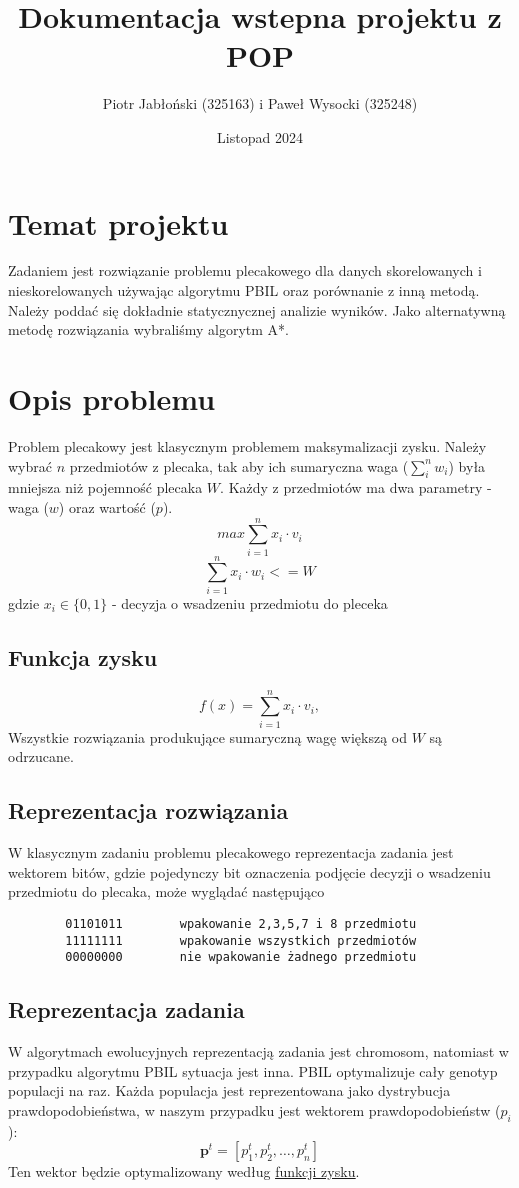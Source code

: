 \documentclass[11pt]{article}
\author{Piotr Jabłoński (325163) i Paweł Wysocki (325248)}
\date{Listopad 2024}
\title{Dokumentacja wstepna projektu z POP}
\begin{document}
\maketitle
\tableofcontents

\pagebreak
\section{Temat projektu}
\label{sec:org3e40057}
Zadaniem jest rozwiązanie problemu plecakowego dla danych skorelowanych i nieskorelowanych używając algorytmu PBIL oraz porównanie z inną metodą. Należy poddać się dokładnie statycznycznej analizie wyników. Jako alternatywną metodę rozwiązania wybraliśmy algorytm A*.
\section{Opis problemu}
\label{sec:org6b0099d}
Problem plecakowy jest klasycznym problemem maksymalizacji zysku. Należy wybrać \(n\) przedmiotów z plecaka, tak aby ich sumaryczna waga (\(\sum_i^n{w_i}\)) była mniejsza niż pojemność plecaka \(W\). Każdy z przedmiotów ma dwa parametry - waga (\(w\)) oraz wartość (\(p\)).
$$
        max \sum_{i=1}^n{x_i \cdot v_i}
$$
$$
        \sum_{i=1}^n{x_i \cdot w_i} <= W
$$
gdzie \(x_i \in \{0, 1\}\) - decyzja o wsadzeniu przedmiotu do pleceka
\subsection{Funkcja zysku}
\label{sec:orge5b1da9}
$$
        f(x) = \sum_{i=1}^n{x_i \cdot v_i},
$$
Wszystkie rozwiązania produkujące sumaryczną wagę większą od \(W\) są odrzucane.
\subsection{Reprezentacja rozwiązania}
\label{sec:orgd3d7332}
W klasycznym zadaniu problemu plecakowego reprezentacja zadania jest wektorem bitów, gdzie pojedynczy bit oznaczenia podjęcie decyzji o wsadzeniu przedmiotu do plecaka, może wyglądać następująco
\begin{verbatim}
        01101011        wpakowanie 2,3,5,7 i 8 przedmiotu
        11111111        wpakowanie wszystkich przedmiotów
        00000000        nie wpakowanie żadnego przedmiotu
\end{verbatim}
\subsection{Reprezentacja zadania}
\label{sec:orgcc0964d}
W algorytmach ewolucyjnych reprezentacją zadania jest chromosom, natomiast w przypadku algorytmu PBIL sytuacja jest inna. PBIL optymalizuje cały genotyp populacji na raz. Każda populacja jest reprezentowana jako dystrybucja prawdopodobieństwa, w naszym przypadku jest wektorem prawdopodobieństw (\(p_i\)):
$$
        \boldsymbol{p}^t = [p_1^t, p_2^t, \dots, p_n^t]
$$
Ten wektor będzie optymalizowany według \uline{\hyperref[sec:org244d765]{funkcji zysku}}.
\end{document}
